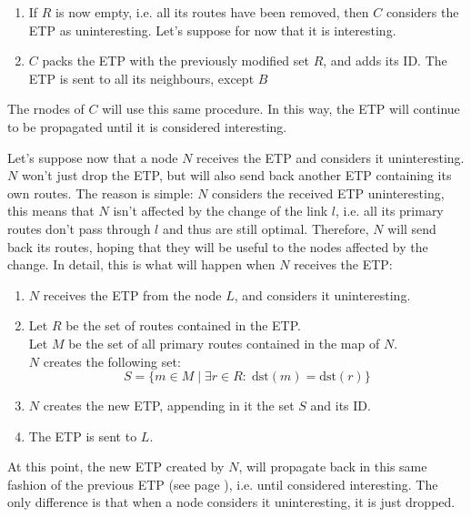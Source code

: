 \documentclass[a4paper]{article}
\newcommand{\T}[1]{\textrm{#1}}
\begin{document}
\begin{description}
\begin{enumerate}
{		good routes are kept, the other are discarded. Notice
		the extension: if the ETP had only one route, it would be
		almost equal to a CTP (the CTP doesn't have the acyclic rule)}
	\item If $R$ is now empty, i.e. all its routes have been removed, then
		$C$ considers the ETP as uninteresting. Let's suppose for now
		that it is interesting.
	\item $C$ packs the ETP with the previously modified
		set $R$, and adds its ID. The ETP is sent to all its neighbours,
		except $B$
	\end{enumerate}
	The rnodes of $C$ will use this same procedure. In this way, the ETP
	will continue to be propagated until it is considered interesting.

	Let's suppose now that a node $N$ receives the ETP and considers it
	uninteresting. $N$ won't just drop the ETP, but will also send back
	another ETP containing its own routes. The reason is simple: $N$
	considers the received ETP uninteresting, this means that $N$ isn't
	affected by the change of the link $l$, i.e. all its primary routes don't
	pass through $l$ and thus are still optimal. Therefore, $N$ will
	send back its routes, hoping that they will be useful to the nodes
	affected by the change. In detail, this is what will happen when $N$
	receives the ETP:
	\begin{enumerate}
		\item $N$ receives the ETP from the node $L$, and considers it
			uninteresting.
		\item Let $R$ be the set of routes contained in the ETP.\\
		Let $M$ be the set of all primary routes contained in the map
		of $N$.\\
		$N$ creates the following set:
		\[
		S=\{m\in M\;|\; \exists r\in R:\;\T{dst}(m)=\T{dst}(r)\}
		\]
		\item $N$ creates the new ETP, appending in it the set $S$ and
			its ID.
		\item The ETP is sent to $L$.
	\end{enumerate}
	At this point, the new ETP created by $N$, will propagate back in this
	same fashion of the previous ETP (see page \pageref{ETPrule1}), i.e.
	until considered interesting. The only difference is that when a node
	considers it uninteresting, it is just dropped.
	\item[A new node joins]
	\item[A node dies]
	\item[Improved link]
\end{description}
\end{document}
